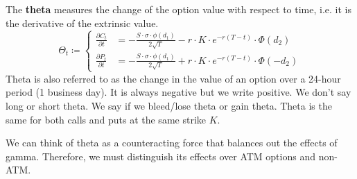 \documentclass{article}
\begin{document}
    \begin{definition}[Theta]
      The \textbf{theta} measures the change of the option value with respect to time, i.e. it is the derivative of the extrinsic value. 
      \begin{equation}
        \Theta_t \coloneqq \begin{cases} 
          \frac{\partial C_t}{\partial t} & =  -\frac{S \cdot \sigma \cdot \phi(d_1)}{2 \sqrt{T}} - r \cdot K \cdot e^{-r(T - t)} \cdot \Phi(d_2) \\ 
          \frac{\partial P_t}{\partial t} & = -\frac{S \cdot \sigma \cdot \phi(d_1)}{2 \sqrt{T}} + r \cdot K \cdot e^{-r(T - t)} \cdot \Phi(-d_2)
        \end{cases}
      \end{equation}
      Theta is also referred to as the change in the value of an option over a 24-hour period (1 business day). It is always negative but we write positive. We don't say long or short theta. We say if we bleed/lose theta or gain theta. Theta is the same for both calls and puts at the same strike $K$.
    \end{definition}

    We can think of theta as a counteracting force that balances out the effects of gamma. Therefore, we must distinguish its effects over ATM options and non-ATM. 
\end{document}
